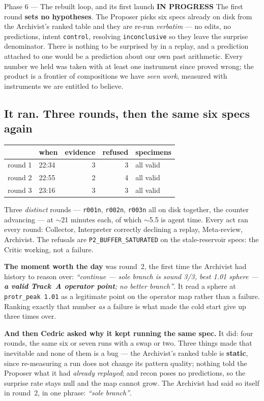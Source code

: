 \documentclass[11pt,a4paper]{article}
\newcommand{\code}[1]{\texttt{#1}}
\newcommand{\prog}{\textcolor{warn}{\textbf{IN PROGRESS}}}
\begin{document}
\begin{phasebox}{Phase 6 --- The rebuilt loop, and its first launch \hfill \prog}
The first round \textbf{sets no hypotheses}. The Proposer picks six specs already on disk from the
Archivist's ranked table and they are re-run \emph{verbatim} --- no edits, no predictions, intent
\code{control}, resolving \code{inconclusive} so they leave the surprise denominator. There is
nothing to be surprised by in a replay, and a prediction attached to one would be a prediction
about our own past arithmetic. Every number we held was taken with at least one instrument since
proved wrong; the product is a frontier of compositions we have \emph{seen work}, measured with
instruments we are entitled to believe.

\subsection*{It ran. Three rounds, then the same six specs again}

\begin{center}\small
\begin{tabular}{@{}l l r r l@{}}
\toprule
& \textbf{when} & \textbf{evidence} & \textbf{refused} & \textbf{specimens}\\
\midrule
round 1 & 22:34 & 3 & 3 & all valid\\
round 2 & 22:55 & 2 & 4 & all valid\\
round 3 & 23:16 & 3 & 3 & all valid\\
\bottomrule
\end{tabular}
\end{center}

Three \emph{distinct} rounds --- \code{r001n}, \code{r002n}, \code{r003n} all on disk together,
the counter advancing --- at $\sim$21 minutes each, of which $\sim$5.5 is agent time. Every act
ran every round: Collector, Interpreter correctly declining a replay, Meta-review, Archivist. The
refusals are \code{P2\_BUFFER\_SATURATED} on the stale-reservoir specs: the Critic working, not a
failure.

\textbf{The moment worth the day} was round~2, the first time the Archivist had history to reason
over: \emph{``continue --- sole branch is sound 3/3, best 1.01 sphere --- \textbf{a valid Track~A
operator point}; no better branch''}. It read a sphere at \code{protr\_peak 1.01} as a legitimate
point on the operator map rather than a failure. Ranking exactly that number \emph{as} a failure is
what made the cold start give up three times over.

\textbf{And then Cedric asked why it kept running the same spec.} It did: four rounds, the same six
or seven runs with a swap or two. Three things made that inevitable and none of them is a bug ---
the Archivist's ranked table is \textbf{static}, since re-measuring a run does not change its
pattern quality; nothing told the Proposer what it had \emph{already replayed}; and recon poses no
predictions, so the surprise rate stays null and the map cannot grow. The Archivist had said so
itself in round~2, in one phrase: \emph{``sole branch''}.


\end{phasebox}
\end{document}
